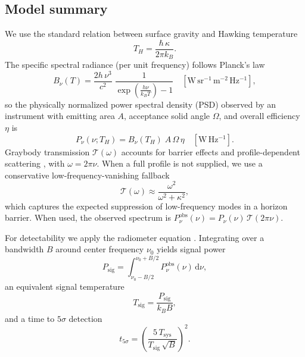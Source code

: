 \documentclass[11pt]{article}
\begin{document}
\subsection{Model summary}
We use the standard relation between surface gravity and Hawking temperature
\begin{equation}
  T_H = \frac{\hbar\,\kappa}{2\pi k_B}.
\end{equation}
The specific spectral radiance (per unit frequency) follows Planck's law
\begin{equation}
  B_{\nu}(T) = \frac{2 h \, \nu^3}{c^2} \; \frac{1}{\exp\!\left(\tfrac{h\nu}{k_B T}\right) - 1} \quad [\mathrm{W\,sr^{-1}\,m^{-2}\,Hz^{-1}}],
\end{equation}
so the physically normalized power spectral density (PSD) observed by an instrument with emitting area $A$, acceptance solid angle $\Omega$, and overall efficiency $\eta$ is
\begin{equation}
  P_{\nu}(\nu; T_H) = B_{\nu}(T_H) \; A\,\Omega\,\eta \quad [\mathrm{W\,Hz^{-1}}].
\end{equation}
Graybody transmission $\mathcal{T}(\omega)$ accounts for barrier effects and profile-dependent scattering \cite{Page1976}, with $\omega = 2\pi\nu$. When a full profile is not supplied, we use a conservative low-frequency-vanishing fallback
\begin{equation}
  \mathcal{T}(\omega) \approx \frac{\omega^2}{\omega^2 + \kappa^2},
\end{equation}
which captures the expected suppression of low-frequency modes in a horizon barrier. When used, the observed spectrum is $P^{\mathrm{obs}}_{\nu}(\nu) = P_{\nu}(\nu)\,\mathcal{T}(2\pi\nu)$.

For detectability we apply the radiometer equation \cite{Wilson2013}. Integrating over a bandwidth $B$ around center frequency $\nu_0$ yields signal power
\begin{equation}
  P_{\mathrm{sig}} = \int_{\nu_0 - B/2}^{\nu_0 + B/2} P^{\mathrm{obs}}_{\nu}(\nu)\,\mathrm{d}\nu,
\end{equation}
an equivalent signal temperature
\begin{equation}
  T_{\mathrm{sig}} = \frac{P_{\mathrm{sig}}}{k_B B},
\end{equation}
and a time to $5\sigma$ detection
\begin{equation}
  t_{5\sigma} = \left( \frac{5\, T_{\mathrm{sys}}}{T_{\mathrm{sig}}\,\sqrt{B}} \right)^2.
\end{equation}
\end{document}
